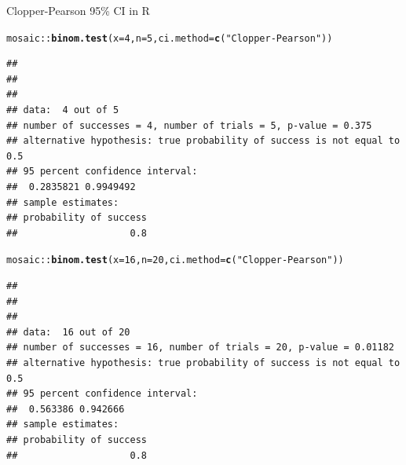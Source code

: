 \documentclass[handout]{beamer}\usepackage[]{graphicx}\usepackage[]{color}
\newcommand{\hlnum}[1]{\textcolor[rgb]{0.686,0.059,0.569}{#1}}%
\newcommand{\hlstr}[1]{\textcolor[rgb]{0.192,0.494,0.8}{#1}}%
\newcommand{\hlcom}[1]{\textcolor[rgb]{0.678,0.584,0.686}{\textit{#1}}}%
\newcommand{\hlopt}[1]{\textcolor[rgb]{0,0,0}{#1}}%
\newcommand{\hlstd}[1]{\textcolor[rgb]{0.345,0.345,0.345}{#1}}%
\newcommand{\hlkwc}[1]{\textcolor[rgb]{0.333,0.667,0.333}{#1}}%
\newcommand{\hlkwd}[1]{\textcolor[rgb]{0.737,0.353,0.396}{\textbf{#1}}}%
\newenvironment{knitrout}{}{} %
\begin{document}


\begin{frame}[fragile]{Clopper-Pearson 95\% CI in R}
\begin{knitrout}\scriptsize
{}\color{fgcolor}
\begin{alltt}
\hlstd{mosaic}\hlopt{::}\hlkwd{binom.test}\hlstd{(}\hlkwc{x}\hlstd{=}\hlnum{4}\hlstd{,} \hlkwc{n}\hlstd{=}\hlnum{5}\hlstd{,} \hlkwc{ci.method}\hlstd{=}\hlkwd{c}\hlstd{(}\hlstr{"Clopper-Pearson"}\hlstd{))}
\end{alltt}
\begin{verbatim}
## 
## 
## 
## data:  4 out of 5
## number of successes = 4, number of trials = 5, p-value = 0.375
## alternative hypothesis: true probability of success is not equal to 0.5
## 95 percent confidence interval:
##  0.2835821 0.9949492
## sample estimates:
## probability of success 
##                    0.8
\end{verbatim}
\begin{alltt}
\hlstd{mosaic}\hlopt{::}\hlkwd{binom.test}\hlstd{(}\hlkwc{x}\hlstd{=}\hlnum{16}\hlstd{,} \hlkwc{n}\hlstd{=}\hlnum{20}\hlstd{,} \hlkwc{ci.method}\hlstd{=}\hlkwd{c}\hlstd{(}\hlstr{"Clopper-Pearson"}\hlstd{))}
\end{alltt}
\begin{verbatim}
## 
## 
## 
## data:  16 out of 20
## number of successes = 16, number of trials = 20, p-value = 0.01182
## alternative hypothesis: true probability of success is not equal to 0.5
## 95 percent confidence interval:
##  0.563386 0.942666
## sample estimates:
## probability of success 
##                    0.8
\end{verbatim}

\end{knitrout}
\end{frame}
\end{document}
